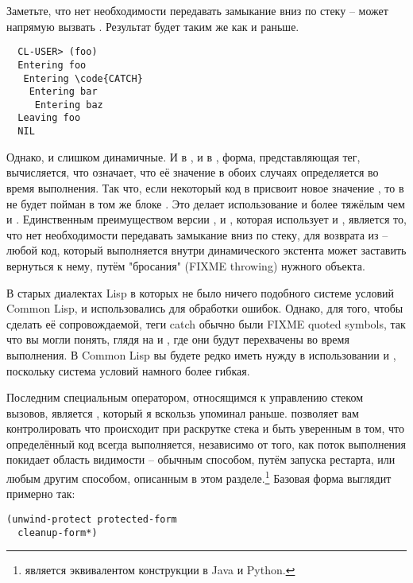 Заметьте, что нет необходимости передавать замыкание вниз по стеку --  может
напрямую вызвать .  Результат будет таким же как и раньше.

\begin{verbatim}
  CL-USER> (foo)
  Entering foo
   Entering \code{CATCH}
    Entering bar
     Entering baz
  Leaving foo
  NIL
\end{verbatim}

Однако,  и  слишком динамичные.  И в , и в
, форма, представляющая тег, вычисляется, что означает, что её значение в
обоих случаях определяется во время выполнения.  Так что, если некоторый код в 
присвоит новое значение , то  в  не будет пойман в том
же блоке .  Это делает использование  и  более тяжёлым
чем  и . Единственным преимуществом версии ,
 и , которая использует  и , является то, что
нет необходимости передавать замыкание вниз по стеку, для возврата из  --
любой код, который выполняется внутри динамического экстента  может заставить
вернуться к нему, путём "бросания" (FIXME throwing) нужного объекта.

В старых диалектах Lisp в которых не было ничего подобного системе условий Common Lisp,
 и  использовались для обработки ошибок.  Однако, для того, чтобы
сделать её сопровождаемой, теги catch обычно были FIXME quoted symbols, так что вы могли
понять, глядя на  и , где они будут перехвачены во время
выполнения. В Common Lisp вы будете редко иметь нужду в использовании  и
, поскольку система условий намного более гибкая.

Последним специальным оператором, относящимся к управлению стеком вызовов, является
, который я вскользь упоминал раньше.  позволяет
вам контролировать что происходит при раскрутке стека и быть уверенным в том, что
определённый код всегда выполняется, независимо от того, как поток выполнения покидает
область видимости  -- обычным способом, путём запуска рестарта, или
любым другим способом, описанным в этом разделе.\footnote{ является
  эквивалентом конструкции  в Java и Python.}  Базовая форма
 выглядит примерно так:

\begin{lstlisting}
(unwind-protect protected-form
  cleanup-form*)
\end{lstlisting}

